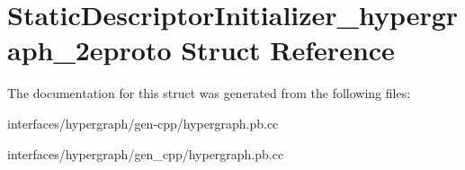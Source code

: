 \hypertarget{structStaticDescriptorInitializer__hypergraph__2eproto}{
\section{StaticDescriptorInitializer\_\-hypergraph\_\-2eproto Struct Reference}
\label{structStaticDescriptorInitializer__hypergraph__2eproto}
}


The documentation for this struct was generated from the following files:\begin{DoxyCompactItemize}
\item 
interfaces/hypergraph/gen-\/cpp/hypergraph.pb.cc\item 
interfaces/hypergraph/gen\_\-cpp/hypergraph.pb.cc\end{DoxyCompactItemize}

